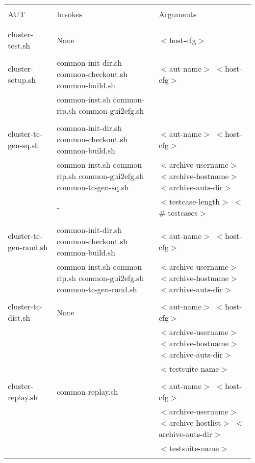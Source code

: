 \begin{table*}
   \centering
   \scriptsize{
   \begin{tabular}{lll}
      \hline
      & & \\
      AUT                    & Invokes & Arguments  \\
      & & \\
      \hline
      & & \\
      cluster-test.sh        & None                     & $<$host-cfg$>$ \\
      & & \\
      cluster-setup.sh       & common-init-dir.sh common-checkout.sh common-build.sh
                                                        & $<$aut-name$>$ $<$host-cfg$>$ \\
                             & common-inst.sh common-rip.sh common-gui2efg.sh
                                                        & \\
      & & \\
      cluster-tc-gen-sq.sh   & common-init-dir.sh common-checkout.sh common-build.sh 
                                                        & $<$aut-name$>$ $<$host-cfg$>$ \\
                             & common-inst.sh common-rip.sh common-gui2efg.sh common-tc-gen-sq.sh
                                                        & $<$archive-username$>$ $<$archive-hostname$>$ $<$archive-auts-dir$>$ \\
                             & -                        & $<$testcase-length$>$ $<$\# testcases$>$ \\
      & & \\
      cluster-tc-gen-rand.sh & common-init-dir.sh common-checkout.sh common-build.sh 
                                                        & $<$aut-name$>$ $<$host-cfg$>$ \\
                             & common-inst.sh common-rip.sh common-gui2efg.sh common-tc-gen-rand.sh
                                                        & $<$archive-username$>$ $<$archive-hostname$>$ $<$archive-auts-dir$>$ \\
      & & \\
      cluster-tc-dist.sh     & None                     & $<$aut-name$>$ $<$host-cfg$>$ \\
                             &                          & $<$archive-username$>$ $<$archive-hostname$>$ $<$archive-auts-dir$>$ \\
                             &                          & $<$testsuite-name$>$ \\
      & & \\
      cluster-replay.sh      & common-replay.sh         & $<$aut-name$>$ $<$host-cfg$>$ \\
                             &                          & $<$archive-username$>$ $<$archive-hostlist$>$ $<$archive-auts-dir$>$ \\
                             &                          & $<$testsuite-name$>$ \\
      & & \\
      \hline
   \end{tabular}

}
\end{table*}
